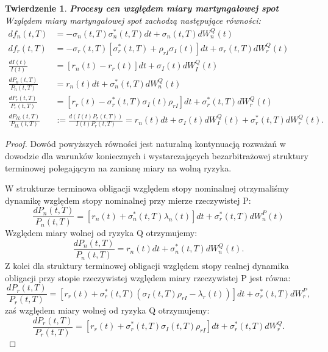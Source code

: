 \documentclass{mini}
\theoremstyle{mythstyle}
\newtheorem{Twierdzenie}{Twierdzenie}[chapter]
\begin{document}
	\begin{Twierdzenie} \textbf{Procesy cen względem miary martyngałowej spot}\\
	Względem miary martyngałowej spot zachodzą następujące równości:
		\begin{align}
		df_n(t,T) &= -\sigma_n(t,T) \sigma^*_n(t,T)dt + \sigma_n(t,T)dW_n^Q(t) \\
		df_r(t,T) &= -\sigma_r(t,T) [\sigma^*_r(t,T) + \rho_{rI}\sigma_I(t)]dt + \sigma_r(t,T)dW_r^Q(t)\\
		\frac{dI(t)}{I(t)} &= [r_n(t) - r_r(t)] dt + \sigma_I(t)dW_I^Q(t)\\
		\frac{dP_n(t,T)}{P_n(t,T)} &= r_n(t)dt + \sigma^*_n(t,T)dW_n^Q(t)\\
		\frac{dP_r(t,T)}{P_r(t,T)} &= [r_r(t) - \sigma^*_r(t,T)\sigma_I(t)\rho_{rI}]dt + \sigma^*_r(t,T) dW_r^Q(t)\\
		\frac{dP_{IL}(t,T)}{P_{IL}(t,T)} &:= \frac{d(I(t)P_r(t,T))}{I(t)P_r(t,T)} = r_n(t)dt + \sigma_I(t)dW_I^Q(t) + \sigma^*_r(t,T) dW_r^Q(t).  
		\end{align}
	\end{Twierdzenie}

\begin{proof}
	 Dowód powyższych równości jest naturalną kontynuacją rozważań w dowodzie dla warunków koniecznych i wystarczających bezarbitrażowej struktury terminowej polegającym na zamianę miary na wolną ryzyka.
	 
	 W strukturze terminowa obligacji względem stopy nominalnej otrzymaliśmy dynamikę względem stopy nominalnej przy mierze rzeczywistej P:
	 \begin{equation}
	 \frac{dP_n(t,T)}{P_n(t,T)} = [r_n(t) +\sigma^*_n(t,T)\lambda_n(t)]dt + \sigma^*_r(t,T)dW^P_n(t)
	 \end{equation}
	 Względem miary wolnej od ryzyka Q otrzymujemy:
	 \begin{equation}
	 \frac{dP_n(t,T)}{P_n(t,T)} = r_n(t)dt + \sigma^*_n(t,T)dW^Q_n(t).
	 \end{equation}
	 Z kolei dla struktury terminowej obligacji względem stopy realnej dynamika obligacji przy stopie rzeczywistej względem miary rzeczywistej P jest równa:
	 \begin{equation}
	 \frac{dP_r(t,T)}{P_r(t,T)} = [r_r(t) +\sigma^*_r(t,T)(\sigma_I(t,T)\rho_{rI}-\lambda_r(t))]dt + \sigma^*_r(t,T)dW^P_r,
	 \end{equation}
	 zaś względem miary wolnej od ryzyka Q otrzymujemy:
	 \begin{equation}
	 \frac{dP_r(t,T)}{P_r(t,T)} = [r_r(t) +\sigma^*_r(t,T)\sigma_I(t,T)\rho_{rI}]dt + \sigma^*_r(t,T)dW^Q_r.
	 \end{equation}
	 
	 
\end{proof}
	
\end{document}
